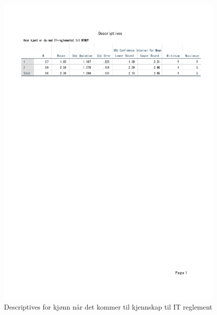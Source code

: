 \begin{figure}[H]
    \centering
    \includegraphics[scale=0.6]{case_1/bilder/kjonn_kjent_descriptive.pdf}
    \caption[Descriptives av kjønn på kjennskap til IT reglement]{Descriptives for kjønn når det kommer til kjennskap til IT reglement}
    \label{fig:fakultet_pastander_descriptive}
\end{figure}

